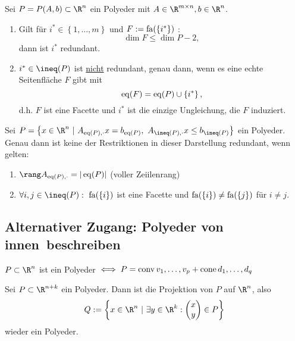 \begin{lemma}
	Sei $P = P(A,b) \subset \R^n$ ein Polyeder mit $A\in \R^{m \times n}, b \in \R^n$.
	\begin{enumerate}[label = (\alph*)]
		\item Gilt für $i^* \in \left\{1,\dots ,m \right\}$ und $F:=\operatorname{fa}(\left\{i^* \right\})$ :
			\begin{equation*}
				\dim F \leq \dim P - 2,
			\end{equation*}
			dann ist $i^*$ redundant.	
		\item $i^* \in \ineq(P)$ ist \underline{nicht} redundant, genau dann, wenn es eine echte Seitenfläche $F$ gibt mit 
			\begin{equation*}
				\operatorname{eq}(F)= \operatorname{eq}(P)\cup \left\{i^* \right\},
			\end{equation*}
			d.h. $F$ ist eine Facette und $i^*$ ist die einzige Ungleichung, die $F$ induziert.
	\end{enumerate}
\end{lemma}
\begin{satz}
	Sei $P = \left\{ x \in \R^n\ |\ A_{\eq(P),\cdot}x = b_{\eq(P)},\ A_{\ineq(P),\cdot}x \leq b_{\ineq(P)}  \right\}$ ein Polyeder.
	Genau dann ist keine der Restriktionen in dieser Darstellung redundant, wenn gelten:
	\begin{enumerate}[label = \alph*.)]
		\item $\rang A_{\eq(P),\cdot}= |\eq(P)|$ (voller Zeiilenrang)
		\item $\forall i,j \in \ineq(P):\ \fa(\left\{i \right\})$ ist eine Facette und $\operatorname{fa}(\left\{i \right\}) \neq \operatorname{fa}(\left\{j \right\})$ für $i\neq j$.
	\end{enumerate}
\end{satz}

\subsection{Alternativer Zugang: Polyeder \glqq von innen\grqq\ beschreiben}
$P \subset \R^n$ ist ein Polyeder $\iff P=\operatorname{conv}{v_{1},\dots ,v_{p}} + \operatorname{cone}{d_{1},\dots ,d_{q}}$
\begin{satz}
	Sei $P \subset \R^{n+k}$ ein Polyeder. 
	Dann ist  die Projektion von $P$ auf $\R^n$, also 
	\begin{equation*}
		Q:= \left\{ x \in \R^n\ |\ \exists y\in \R^k: 
			\begin{pmatrix}
				x\\y
			\end{pmatrix}
			\in P
		 \right\}
	\end{equation*}
	wieder ein Polyeder.	
\end{satz}

